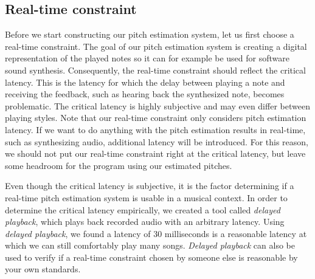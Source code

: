 \documentclass[a4paper,10pt,twocolumn]{article}
\begin{document}





\subsection{Real-time constraint}  \label{sec:constraint}
Before we start constructing our pitch estimation system, let us first choose a real-time constraint. The goal of our pitch estimation system is creating a digital representation of the played notes so it can for example be used for software sound synthesis. Consequently, the real-time constraint should reflect the critical latency. This is the latency for which the delay between playing a note and receiving the feedback, such as hearing back the synthesized note, becomes problematic. The critical latency is highly subjective and may even differ between playing styles.
Note that our real-time constraint only considers pitch estimation latency. If we want to do anything with the pitch estimation results in real-time, such as synthesizing audio, additional latency will be introduced. For this reason, we should not put our real-time constraint right at the critical latency, but leave some headroom for the program using our estimated pitches.

Even though the critical latency is subjective, it is the factor determining if a real-time pitch estimation system is usable in a musical context. In order to determine the critical latency empirically, we created a tool called \textit{delayed playback}, which plays back recorded audio with an arbitrary latency. Using \textit{delayed playback}, we found a latency of 30 milliseconds is a reasonable latency at which we can still comfortably play many songs. \textit{Delayed playback} can also be used to verify if a real-time constraint chosen by someone else is reasonable by your own standards.%
\end{document}
